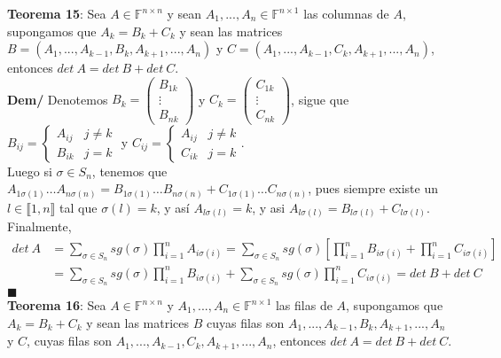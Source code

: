 \documentclass[11pt,a4paper]{article}
\newcommand*{\QEDA}{\null\nobreak\hfill\ensuremath{\blacksquare}}
\begin{document}
\textbf{Teorema 15}: Sea $A \in \mathbb{F}^{n \times n}$ y sean $A_1, ..., A_n \in \mathbb{F}^{n \times 1}$ las columnas de $A$, supongamos que $A_k = B_k + C_k$ y sean las matrices $B=(A_1, ..., A_{k-1}, B_k, A_{k+1},...,A_n)$ y $C=(A_1, ..., A_{k-1}, C_k, A_{k+1},...,A_n)$, entonces $det\ A = det\ B + det\ C$.\\
\textbf{Dem/} Denotemos $B_k = \begin{pmatrix} B_{1k} \\ \vdots \\ B_{nk}\end{pmatrix}$ y $C_k = \begin{pmatrix} C_{1k} \\ \vdots \\ C_{nk}\end{pmatrix}$, sigue que $B_{ij} = \begin{cases} A_{ij} & j \not = k \\ B_{ik} & j = k \end{cases}$ y $C_{ij} = \begin{cases} A_{ij} & j \not = k \\ C_{ik} & j = k \end{cases}$. \\
Luego si $\sigma \in S_n$, tenemos que $A_{1\sigma(1)} \hdots A_{n\sigma(n)} = B_{1\sigma(1)} \hdots B_{n\sigma(n)} + C_{1\sigma(1)} \hdots C_{n\sigma(n)}$, pues siempre existe un $l \in \llbracket 1, n \rrbracket$ tal que $\sigma(l) = k$, y as\'i $A_{l\sigma(l)} = k$, y asi $A_{l\sigma(l)} = B_{l\sigma(l)} + C_{l\sigma(l)}$. Finalmente,
\begin{align*}
det\ A 
&= \sum_{\sigma \in S_n} sg(\sigma) \prod_{i = 1}^n A_{i\sigma(i)} 
= \sum_{\sigma \in S_n} sg(\sigma) \left[ \prod_{i = 1}^n B_{i\sigma(i)} + \prod_{i = 1}^n C_{i\sigma(i)} \right] \\
&= \sum_{\sigma \in S_n} sg(\sigma) \prod_{i = 1}^n B_{i\sigma(i)}  + \sum_{\sigma \in S_n} sg(\sigma) \prod_{i = 1}^n C_{i\sigma(i)} 
= det\ B + det\ C
\end{align*}
\QEDA\\

\textbf{Teorema 16}: Sea $A \in \mathbb{F}^{n \times n}$ y $A_1, ..., A_n \in \mathbb{F}^{n \times 1}$ las filas de $A$, supongamos que $A_k = B_k + C_k$ y sean las matrices $B$ cuyas filas son $A_1, ..., A_{k-1}, B_k, A_{k+1},...,A_n$ y $C$, cuyas filas son $A_1, ..., A_{k-1}, C_k, A_{k+1},...,A_n$, entonces $det\ A = det\ B + det\ C$.\\
\end{document}
